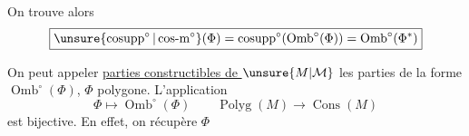 On trouve alors
\[
\boxed{\unsure{\operatorname{cosupp}^{\circ}|\operatorname{cos-m}^{\circ}}(\Phi)=\operatorname{cosupp}^{\circ}(\operatorname{Omb}^{\circ}(\Phi))=\operatorname{Omb}^{\circ}(\Phi^*)}
\]

On peut appeler \uline{parties constructibles de $\unsure{M|\mathcal M}$} les parties de la forme $\operatorname{Omb}^{\circ}(\Phi)$, $\Phi$ polygone.  L'application
\[
\Phi\longmapsto\operatorname{Omb}^{\circ}(\Phi)\qquad\operatorname{Polyg}(M)\longrightarrow\operatorname{Cons}(M)
\]
est bijective. En effet, on récupère $\Phi$
